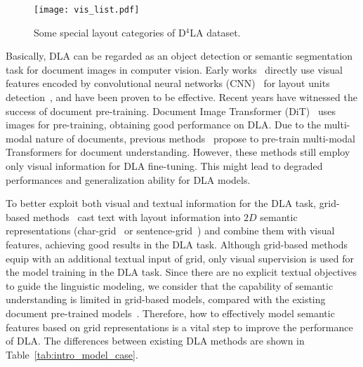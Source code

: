 \documentclass[10pt,twocolumn,letterpaper]{article}
\begin{document}
\begin{figure}[!htp]\centering
\texttt{[image: vis\_list.pdf]}
\caption{Some special layout categories of D$^4$LA dataset.}
 \label{fig:vis_cats}
\end{figure} 

Basically, DLA can be regarded as an object detection or semantic segmentation task for document images in computer vision.
Early works~\cite{schreiber2017deepdesrt,CascadeTabNet} directly use visual features encoded by convolutional neural networks (CNN)~\cite{he2016deep} for layout units detection~\cite{ren2015faster,liu2016ssd, redmon2018yolov3, he2017mask}, and have been proven to be effective.
Recent years have witnessed the success of document pre-training.
Document Image Transformer (DiT)~\cite{li2022dit} uses images for pre-training, obtaining good performance on DLA.
Due to the multi-modal nature of documents, previous methods~\cite{gu2021unidoc,huang2022layoutlmv3} propose to pre-train multi-modal Transformers for document understanding.
However, these methods still employ only visual information for DLA fine-tuning.
This might lead to degraded performances and generalization ability for DLA models.

To better exploit both visual and textual information for the DLA task, grid-based methods~\cite{yang2017learning,kaplan2021combining,zhang2021vsr} cast text with layout information into $2D$ semantic representations (char-grid~\cite{katti2018chargrid,kaplan2021combining} or sentence-grid~\cite{yang2017learning,zhang2021vsr}) and combine them with visual features,
achieving good results in the DLA task.
Although grid-based methods equip with an additional textual input of grid, only visual supervision is used for the model training in the DLA task.
Since there are no explicit textual objectives to guide the linguistic modeling, 
we consider that the capability of semantic understanding is limited in grid-based models, 
compared with the existing document pre-trained models~\cite{huang2022layoutlmv3}.
Therefore, how to effectively model semantic features based on grid representations is a vital step to improve the performance of DLA.
The differences between existing DLA methods are shown in Table~\ref{tab:intro_model_case}. 
\end{document}
